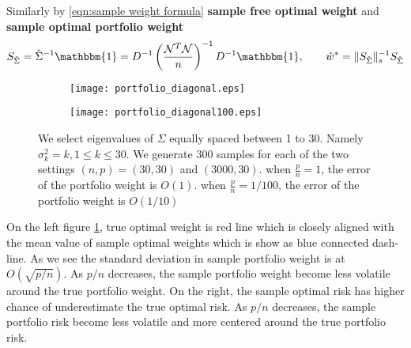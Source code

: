\documentclass[12pt]{extarticle}
\newcommand{\cN}{{\mathcal{N}}}
\newcommand{\1}{\mathbbm{1}}
\DeclareMathOperator{\E}{\mathbb{E}}
\numberwithin{equation}{section}
\begin{document}
Similarly by \ref{eqn:sample weight formula} \textbf{sample free optimal weight} and \textbf{sample optimal portfolio weight}
\[
S_{\hat{\Sigma}} = \hat{\Sigma}^{-1}\1 = D^{-1} \left( \frac{\cN^T\cN}{n}\right)^{-1} D^{-1}\1 , \qquad \hat{w}^* = \|S_{\hat{\Sigma}}\|_s^{-1} S_{\hat{\Sigma}}
\]


\begin{figure}[H]
     \centering
     \begin{subfigure}[b]{\textwidth}
         \centering
         \texttt{[image: portfolio\_diagonal.eps]}
     \end{subfigure} 
\end{figure}%
\begin{figure}[ht]\ContinuedFloat
     \begin{subfigure}[ht]{\textwidth}
         \centering
    \texttt{[image: portfolio\_diagonal100.eps]}
     \end{subfigure}
     \caption{We select eigenvalues of $\Sigma$ equally spaced between 1 to 30. Namely $\sigma_k^2=k, 1\le k\le 30$. We generate 300 samples for each of the two settings $(n,p)= (30,30)$ and $(3000,30)$. when $\frac{p}{n}=1$, the error of the portfolio weight is  $O(1)$. when $\frac{p}{n}=1/100$, the error of the portfolio weight is  $O(1/10)$}
     \label{fig:diagonal}
\end{figure}


 On the left figure \ref{fig:diagonal}, true optimal weight is red  line which is closely aligned with the mean value of sample optimal weights which is show as blue connected dash-line. As we see the standard deviation in sample portfolio weight is at $O(\sqrt{p/n})$. As $p/n$ decreases, the sample portfolio weight become less volatile around the true portfolio weight. On the right, the sample optimal risk has higher chance of underestimate the true optimal risk. As $p/n$ decreases, the sample portfolio risk become less volatile and more centered around the true portfolio risk. 
% 


\end{document}
